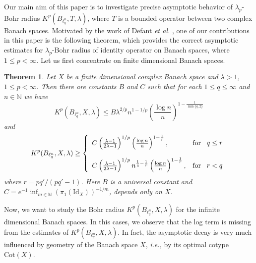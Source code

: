 \documentclass[a4paper,12pt]{amsart}
\newtheorem{thm}{Theorem}[section]
\theoremstyle{definition}
\begin{document}
Our main aim of this paper is to investigate precise asymptotic behavior of $\lambda_{p}$-Bohr radius $K^p(B_{\ell^n_q},T,\lambda)$, where $T$ is a bounded operator between two complex Banach spaces. Motivated by the work of Defant {\it et al.} \cite{defant-adv-math-2012}, one of our contributions in this paper is the following theorem, which provides the correct asymptotic estimates for $\lambda_{p}$-Bohr radius of identity operator on Banach spaces, where $1\leq p<\infty$. Let us first concentrate on finite dimensional Banach spaces. 
\begin{thm}\label{Pal-Vasu-P5-thm-01}
	Let $X$ be a finite dimensional complex Banach space and $\lambda>1$, $1\leq p<\infty$. Then there are constants $B$ and $C$ such that for each $1\leq q\leq \infty$ and $n\in \mathbb{N}$ we have 
	\begin{equation*}
		K^p(B_{\ell^n_q},X,\lambda)\leq B \lambda^{2/p}n^{1-1/p}\left(\frac{\log n}{n}\right)^{1-\frac{1}{\min\{q, 2\}}}
	\end{equation*}
	and
	$$
	K^p(B_{\ell^n_q},X,\lambda)\geq \left\{\begin{array}{ll}
		C\left(\frac{\lambda-1}{2\lambda-1}\right)^{1/p} \left(\frac{\log n}{n}\right)^{1-\frac{1}{r}}, & \mbox{for \, $q\leq r$}\\[5mm] 
		
		C\left(\frac{\lambda-1}{2\lambda-1}\right)^{1/p} n^{\frac{1}{q}-\frac{1}{r}}\left(\frac{\log n}{n}\right)^{1-\frac{1}{r}}, & \mbox{for \, $r<q$}
	\end{array}\right.
	$$
	where $r=pq'/(pq'-1)$. Here $B$ is a universal constant and $C=e^{-1}\inf_{m\in \mathbb{N}}(\pi_{1}(\mbox{Id}_{X}))^{-1/m}$, depends only on $X$.
\end{thm}
Now, we want to study the Bohr radius $K^p(B_{\ell^n_q},X,\lambda)$ for the infinite dimensional Banach spaces. In this cases, we observe that the log term is missing from the estimates of $K^p(B_{\ell^n_q},X,\lambda)$. In fact, the asymptotic decay is very much influenced by geometry of the Banach space $X$, {\it i.e.,} by its optimal cotype $\text{Cot}(X)$.
\end{document}
